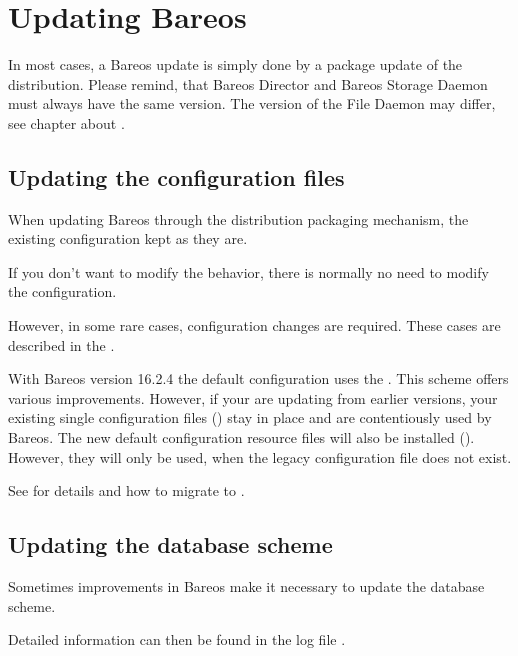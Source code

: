 \chapter{Updating Bareos}
\label{bareos-update}

In most cases, a Bareos update is simply done by a package update of the distribution.
Please remind, that Bareos Director and Bareos Storage Daemon must always have the same version.
The version of the File Daemon may differ, see chapter about .

\section{Updating the configuration files}

When updating Bareos through the distribution packaging mechanism,
the existing configuration kept as they are.

If you don't want to modify the behavior,
there is normally no need to modify the configuration.

However, in some rare cases, configuration changes are required.
These cases are described in the .

With Bareos version 16.2.4 the default configuration uses the .
This scheme offers various improvements. However, if your are updating from earlier versions,
your existing single configuration files () stay in place and are contentiously used by Bareos.
The new default configuration resource files will also be installed ().
However, they will only be used, when the legacy configuration file does not exist.

See  for details and how to migrate to .


\section{Updating the database scheme}

Sometimes improvements in Bareos make it necessary to update the database scheme.


Detailed information can then be found in the log file \logfileUnix.


